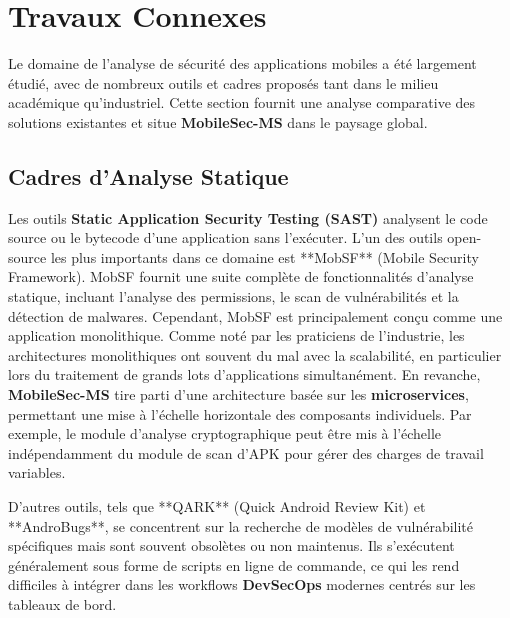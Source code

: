 \documentclass[
  journal=largetwo,
  manuscript=article-type,
  year=2025,
  volume=1,
]{cup-journal}
\begin{document}
\section{Travaux Connexes}
\label{sec-related-work}

Le domaine de l'analyse de sécurité des applications mobiles a été largement étudié, avec de nombreux outils et cadres proposés tant dans le milieu académique qu'industriel. Cette section fournit une analyse comparative des solutions existantes et situe \textbf{MobileSec-MS} dans le paysage global.

\subsection{Cadres d'Analyse Statique}
Les outils \textbf{Static Application Security Testing (SAST)} analysent le code source ou le bytecode d'une application sans l'exécuter. L'un des outils open-source les plus importants dans ce domaine est **MobSF** (Mobile Security Framework). MobSF fournit une suite complète de fonctionnalités d'analyse statique, incluant l'analyse des permissions, le scan de vulnérabilités et la détection de malwares. Cependant, MobSF est principalement conçu comme une application monolithique. Comme noté par les praticiens de l'industrie, les architectures monolithiques ont souvent du mal avec la scalabilité, en particulier lors du traitement de grands lots d'applications simultanément. En revanche, \textbf{MobileSec-MS} tire parti d'une architecture basée sur les \textbf{microservices}, permettant une mise à l'échelle horizontale des composants individuels. Par exemple, le module d'analyse cryptographique peut être mis à l'échelle indépendamment du module de scan d'APK pour gérer des charges de travail variables.

D'autres outils, tels que **QARK** (Quick Android Review Kit) et **AndroBugs**, se concentrent sur la recherche de modèles de vulnérabilité spécifiques mais sont souvent obsolètes ou non maintenus. Ils s'exécutent généralement sous forme de scripts en ligne de commande, ce qui les rend difficiles à intégrer dans les workflows \textbf{DevSecOps} modernes centrés sur les tableaux de bord.
\end{document}
